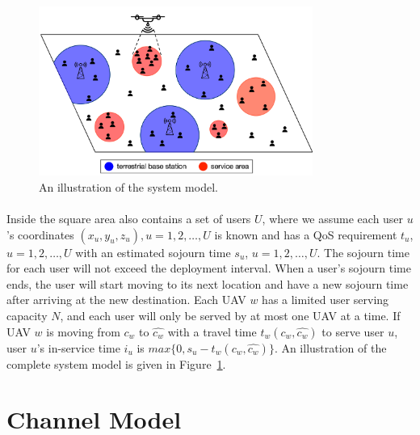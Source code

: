\documentclass[a4paper,12pt]{report}
\begin{document}
\begin{figure}
    \centering
    \includegraphics[width=0.8\textwidth]{Figure 1.png}
    \caption{An illustration of the system model.}
    \label{fig:System Model Example}
\end{figure}

\paragraph{}
Inside the square area also contains a set of users $U$, where we assume each user $u$'s coordinates $(x_{u},y_{u},z_{u}), u = 1, 2, \ldots, U$ is known and has a QoS requirement $t_{u}$, $u = 1, 2, \ldots, U$ with an estimated sojourn time $s_{u}$, $u = 1, 2, \ldots, U$. The sojourn time for each user will not exceed the deployment interval. When a user's sojourn time ends, the user will start moving to its next location and have a new sojourn time after arriving at the new destination. Each UAV $w$ has a limited user serving capacity $N$, and each user will only be served by at most one UAV at a time. If UAV $w$ is moving from $c_{w}$ to $\hat{c_{w}}$ with a travel time $t_{w}(c_{w}, \hat{c_{w}})$ to serve user $u$, user $u$'s in-service time $i_{u}$ is $max\{0, s_{u} - t_{w}(c_{w}, \hat{c_{w}})\}$. An illustration of the complete system model is given in Figure~\ref{fig:System Model Example}.

\section{Channel Model}
\end{document}
